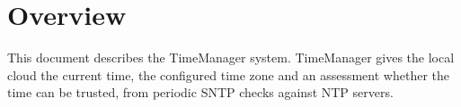 \documentclass[a4paper]{arrowhead}
\begin{document}
\sloppy

\ArrowheadSetup

\begin{center}
  \vspace*{1cm}
  \huge{\arrowtitle}

  \vspace*{0.2cm}
  \LARGE{\arrowtype}
  \vspace*{1cm}

  \vspace*{\fill}


  \vspace*{1cm}
  \vspace*{\fill}

  \begin{abstract}
    This document describes the TimeManager support system of the Eclipse Arrowhead 5.2.2 framework, as implemented in \texttt{ah5-TimeManager-java-spring} of the primary Java source tree (\texttt{Eclipse-Arrowhead-java}) and deployed with the standalone Compose definition of that folder.
  \end{abstract}

  \vspace*{1cm}
\end{center}

\newpage

\tableofcontents
\newpage

\section{Overview}
\label{sec:overview}

This document describes the TimeManager system. TimeManager gives the local cloud the current time, the configured time zone and an assessment whether the time can be trusted, from periodic SNTP checks against NTP servers.
\end{document}
